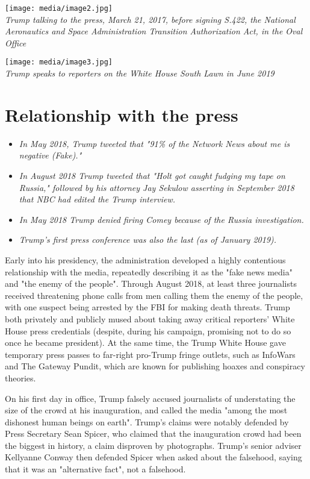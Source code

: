 \texttt{[image: media/image2.jpg]}\\
\emph{Trump talking to the press, March 21, 2017, before signing S.422,
the National Aeronautics and Space Administration Transition
Authorization Act, in the Oval Office}

\texttt{[image: media/image3.jpg]}\\
\emph{Trump speaks to reporters on the White House South Lawn in June
2019}

\section{Relationship with the press}\label{relationship-with-the-press}

\begin{itemize}
\item
  \emph{In May 2018, Trump tweeted that "91\% of the Network News about
  me is negative (Fake)."}
\item
  \emph{In August 2018 Trump tweeted that "Holt got caught fudging my
  tape on Russia," followed by his attorney Jay Sekulow asserting in
  September 2018 that NBC had edited the Trump interview.}
\item
  \emph{In May 2018 Trump denied firing Comey because of the Russia
  investigation.}
\item
  \emph{Trump's first press conference was also the last (as of January
  2019).}
\end{itemize}

Early into his presidency, the administration developed a highly
contentious relationship with the media, repeatedly describing it as the
"fake news media" and "the enemy of the people". Through August 2018, at
least three journalists received threatening phone calls from men
calling them the enemy of the people, with one suspect being arrested by
the FBI for making death threats. Trump both privately and publicly
mused about taking away critical reporters' White House press
credentials (despite, during his campaign, promising not to do so once
he became president). At the same time, the Trump White House gave
temporary press passes to far-right pro-Trump fringe outlets, such as
InfoWars and The Gateway Pundit, which are known for publishing hoaxes
and conspiracy theories.

On his first day in office, Trump falsely accused journalists of
understating the size of the crowd at his inauguration, and called the
media "among the most dishonest human beings on earth". Trump's claims
were notably defended by Press Secretary Sean Spicer, who claimed that
the inauguration crowd had been the biggest in history, a claim
disproven by photographs. Trump's senior adviser Kellyanne Conway then
defended Spicer when asked about the falsehood, saying that it was an
"alternative fact", not a falsehood.

